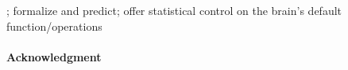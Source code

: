 \documentclass{article} %
\begin{document}
; formalize and predict; offer statistical control on the brain's default function/operations




\paragraph{Acknowledgment}


\small


\end{document}
